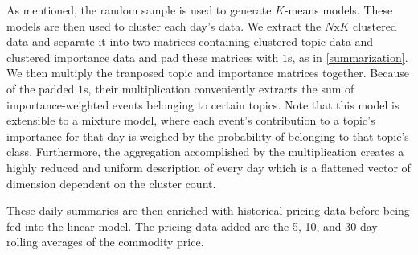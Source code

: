 As mentioned, the random sample is used to generate $K$-means models. These models are then used to cluster each day's data. We extract the $N$x$K$ clustered data and separate it into two matrices containing clustered topic data and clustered importance data and pad these matrices with $1$s, as in \ref{summarization}. We then multiply the tranposed topic and importance matrices together. Because of the padded $1$s, their multiplication conveniently extracts the sum of importance-weighted events belonging to certain topics. Note that this model is extensible to a mixture model, where each event's contribution to a topic's importance for that day is weighed by the probability of belonging to that topic's class. Furthermore, the aggregation accomplished by the multiplication creates a highly reduced and uniform description of every day which is a flattened vector of dimension dependent on the cluster count.

These daily summaries are then enriched with historical pricing data before being fed into the linear model. The pricing data added are the 5, 10, and 30 day rolling averages of the commodity price. %


